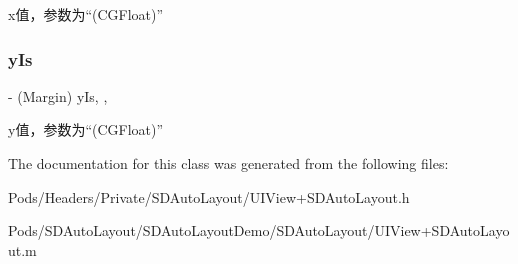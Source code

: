 x值，参数为“(\+C\+G\+Float)” \mbox{\label{interface_s_d_auto_layout_model_a2ab0b8cf517f9b888834959b83e18eba}} 
\subsubsection{\texorpdfstring{y\+Is}{yIs}}
{\footnotesize\ttfamily -\/ (Margin) y\+Is\hspace{0.3cm}{\ttfamily [read]}, {\ttfamily [nonatomic]}, {\ttfamily [copy]}}

y值，参数为“(\+C\+G\+Float)” 

The documentation for this class was generated from the following files\+:\begin{DoxyCompactItemize}
\item 
Pods/\+Headers/\+Private/\+S\+D\+Auto\+Layout/U\+I\+View+\+S\+D\+Auto\+Layout.\+h\item 
Pods/\+S\+D\+Auto\+Layout/\+S\+D\+Auto\+Layout\+Demo/\+S\+D\+Auto\+Layout/U\+I\+View+\+S\+D\+Auto\+Layout.\+m\end{DoxyCompactItemize}
